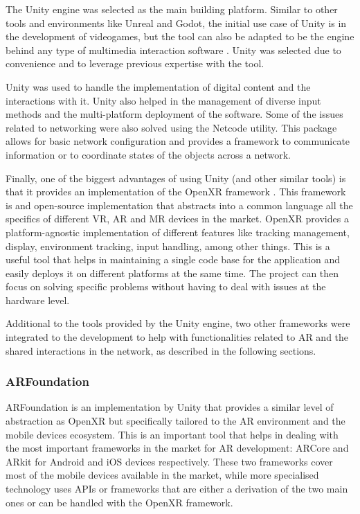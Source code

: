 The Unity engine was selected as the main building platform. Similar to other tools and environments like Unreal and Godot, the initial use case of Unity is in the
development of videogames, but the tool can also be adapted to be the engine behind any type of multimedia interaction software \parencite{hussain_2020,codemonkey_2024}.
Unity was selected due to convenience and to leverage previous expertise with the tool.

Unity was used to handle the implementation of digital content and the interactions with it. Unity also helped in the management of diverse input methods and the
multi-platform deployment of the software. Some of the issues related to networking were also solved using the Netcode utility. This package allows for basic network
configuration and provides a framework to communicate information or to coordinate states of the objects across a network.

Finally, one of the biggest advantages of using Unity (and other similar tools) is that it provides an implementation of the OpenXR framework \parencite{openxr_2016}.
This framework is and open-source implementation that abstracts into a common language all the specifics of different \acf{VR}, \ac{AR} and \ac{MR} devices in the market.
OpenXR provides a platform-agnostic implementation of different features like tracking management, display, environment tracking, input handling, among other things. This
is a useful tool that helps in maintaining a single code base for the application and easily deploys it on different platforms at the same time. The project can then focus
on solving specific problems without having to deal with issues at the hardware level.

Additional to the tools provided by the Unity engine, two other frameworks were integrated to the development to help with functionalities related to \ac{AR} and the
shared interactions in the network, as described in the following sections.

\subsubsection{ARFoundation \label{sec:4-3-2-1}}

ARFoundation is an implementation by Unity that provides a similar level of abstraction as OpenXR but specifically tailored to the \ac{AR} environment and the mobile
devices ecosystem. This is an important tool that helps in dealing with the most important frameworks in the market for \ac{AR} development: ARCore and ARkit for Android
and iOS devices respectively. These two frameworks cover most of the mobile devices available in the market, while more specialised technology uses APIs or frameworks that
are either a derivation of the two main ones or can be handled with the OpenXR framework.

